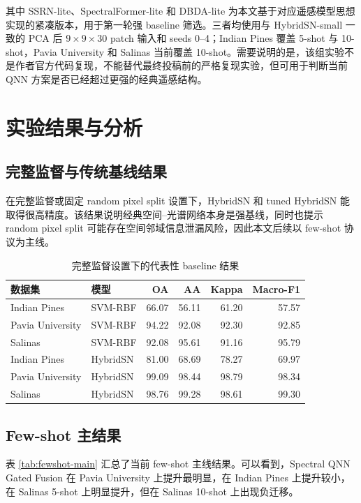 \documentclass[UTF8,a4paper,zihao=-4,fontset=fandol]{ctexart}
\begin{document}
其中 SSRN-lite、SpectralFormer-lite 和 DBDA-lite 为本文基于对应遥感模型思想实现的紧凑版本，用于第一轮强 baseline 筛选。三者均使用与 HybridSN-small 一致的 PCA 后 $9\times9\times30$ patch 输入和 seeds 0--4；Indian Pines 覆盖 5-shot 与 10-shot，Pavia University 和 Salinas 当前覆盖 10-shot。需要说明的是，该组实验不是作者官方代码复现，不能替代最终投稿前的严格复现实验，但可用于判断当前 QNN 方案是否已经超过更强的经典遥感结构。

\section{实验结果与分析}

\subsection{完整监督与传统基线结果}

在完整监督或固定 random pixel split 设置下，HybridSN 和 tuned HybridSN 能取得很高精度。该结果说明经典空间--光谱网络本身是强基线，同时也提示 random pixel split 可能存在空间邻域信息泄漏风险，因此本文后续以 few-shot 协议为主线。

\begin{table}[htbp]
\centering
\caption{完整监督设置下的代表性 baseline 结果}
\label{tab:full-baseline}
\begin{tabular}{llrrrr}
\toprule
数据集 & 模型 & OA & AA & Kappa & Macro-F1 \\
\midrule
Indian Pines & SVM-RBF & 66.07 & 56.11 & 61.20 & 57.57 \\
Pavia University & SVM-RBF & 94.22 & 92.08 & 92.30 & 92.85 \\
Salinas & SVM-RBF & 92.08 & 95.61 & 91.16 & 95.79 \\
Indian Pines & HybridSN & 81.00 & 68.69 & 78.27 & 69.97 \\
Pavia University & HybridSN & 99.09 & 98.44 & 98.79 & 98.34 \\
Salinas & HybridSN & 98.76 & 99.28 & 98.61 & 99.30 \\
\bottomrule
\end{tabular}
\end{table}

\subsection{Few-shot 主结果}

表 \ref{tab:fewshot-main} 汇总了当前 few-shot 主线结果。可以看到，Spectral QNN Gated Fusion 在 Pavia University 上提升最明显，在 Indian Pines 上提升较小，在 Salinas 5-shot 上明显提升，但在 Salinas 10-shot 上出现负迁移。
\end{document}
